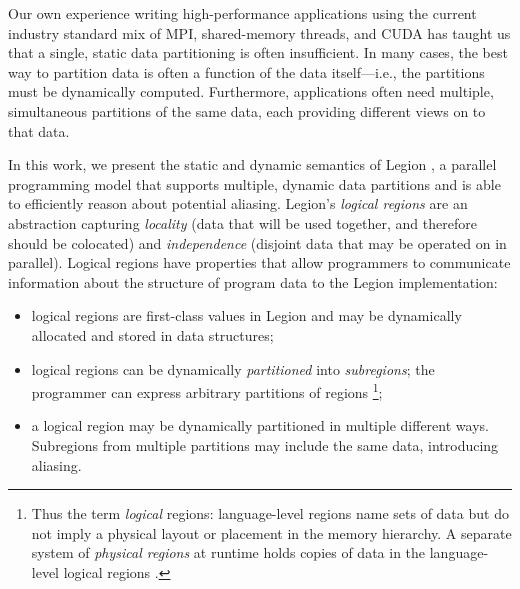 Our own experience writing high-performance applications
using the current industry standard mix of MPI, shared-memory
threads, and CUDA has taught us that a
single, static data partitioning is often insufficient.  In many cases, the
best way to partition data is often a function of the data
itself---i.e., the partitions must be dynamically computed.
Furthermore, applications often need multiple, simultaneous partitions of
the same data, each providing different views on to that data.  

In this work, we present the static and dynamic semantics of Legion \cite{Legion12},
a parallel programming model that supports multiple, dynamic data partitions and is
able to efficiently reason about potential aliasing.
Legion's {\em logical regions} are an abstraction capturing {\em locality} 
(data that will be used together, and therefore should be colocated) 
and {\em independence} (disjoint data that may be operated on in parallel).  
Logical regions have properties that allow programmers to communicate information
about the structure of program data to the Legion implementation:
\begin{itemize}
\item  logical regions are first-class values in Legion
and may be dynamically allocated and stored in data structures;

\item logical regions can be dynamically {\em partitioned} into {\em subregions}; 
the programmer can express arbitrary partitions of regions
\footnote{Thus
  the term {\em logical} regions: language-level regions
  name sets of data but do not imply a physical layout or placement in
  the memory hierarchy. A separate system of {\em physical regions} at
  runtime holds copies of data in the language-level logical regions
  \cite{Legion12}.};

\item  a logical region may be dynamically partitioned in multiple different ways.
Subregions from multiple partitions may include the same data, introducing aliasing.

\end{itemize}


